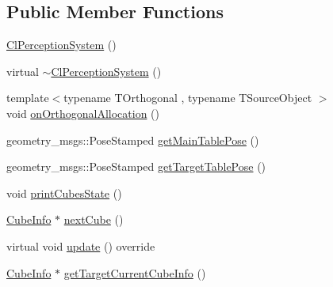 \subsection*{Public Member Functions}
\begin{DoxyCompactItemize}
\item 
\hyperlink{classsm__fetch__six__table__pick__n__sort__1_1_1cl__perception__system_1_1ClPerceptionSystem_a4ead38e217eb7cc0dc216927c92502ba}{Cl\+Perception\+System} ()
\item 
virtual \hyperlink{classsm__fetch__six__table__pick__n__sort__1_1_1cl__perception__system_1_1ClPerceptionSystem_a52124320be2167fb5cbc0f4ac090bf9d}{$\sim$\+Cl\+Perception\+System} ()
\item 
{\footnotesize template$<$typename T\+Orthogonal , typename T\+Source\+Object $>$ }\\void \hyperlink{classsm__fetch__six__table__pick__n__sort__1_1_1cl__perception__system_1_1ClPerceptionSystem_a5732d36d396a5046195ed04093d50021}{on\+Orthogonal\+Allocation} ()
\item 
geometry\+\_\+msgs\+::\+Pose\+Stamped \hyperlink{classsm__fetch__six__table__pick__n__sort__1_1_1cl__perception__system_1_1ClPerceptionSystem_a99ee4544e986811d5c7ff9dcce552eb0}{get\+Main\+Table\+Pose} ()
\item 
geometry\+\_\+msgs\+::\+Pose\+Stamped \hyperlink{classsm__fetch__six__table__pick__n__sort__1_1_1cl__perception__system_1_1ClPerceptionSystem_a61edffc5d1c6332a211324a328f1ba19}{get\+Target\+Table\+Pose} ()
\item 
void \hyperlink{classsm__fetch__six__table__pick__n__sort__1_1_1cl__perception__system_1_1ClPerceptionSystem_af3da61c8b8f5ec1686657a1c6dc18f0b}{print\+Cubes\+State} ()
\item 
\hyperlink{structsm__fetch__six__table__pick__n__sort__1_1_1cl__perception__system_1_1CubeInfo}{Cube\+Info} $\ast$ \hyperlink{classsm__fetch__six__table__pick__n__sort__1_1_1cl__perception__system_1_1ClPerceptionSystem_a5df76b1b2bd090465ac2adf6f7c059d3}{next\+Cube} ()
\item 
virtual void \hyperlink{classsm__fetch__six__table__pick__n__sort__1_1_1cl__perception__system_1_1ClPerceptionSystem_a87292907b7b771d19d91c6de47ea8d1d}{update} () override
\item 
\hyperlink{structsm__fetch__six__table__pick__n__sort__1_1_1cl__perception__system_1_1CubeInfo}{Cube\+Info} $\ast$ \hyperlink{classsm__fetch__six__table__pick__n__sort__1_1_1cl__perception__system_1_1ClPerceptionSystem_a4103ba8479b122c7af34b3b51102c5d5}{get\+Target\+Current\+Cube\+Info} ()

\end{DoxyCompactItemize}
